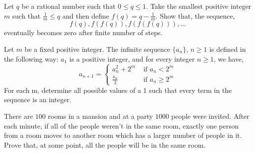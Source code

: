 \begin{problem}
Let $q$ be a rational number such that $0 \le q \le 1.$ Take the smallest positive integer 
$m$ such that $\frac{1}{m} \le q$ and then define $f (q) = q - \frac{1}{m}$. Show that, the sequence,
\[ f (q), f (f (q)), f (f (f (q))), \ldots \]
eventually becomes zero after finite number of steps.
	\begin{hintone}
	\end{hintone}
\end{problem}

\begin{problem}[APMO 2019/2]
Let $m$ be a fixed positive integer. The infinite sequence $\{a_n\}$,  $n\ge 1$
is defined in the following way: $a_1$ is a positive integer, and for every integer $n \ge 1$,
we have,
\[ a_{n+1} = \begin{cases}
			a_n ^2 + 2^m & \text{ if } a_n < 2^m \\
			\frac{a_n}{2} & \text{ if } a_n \ge 2^m
		\end{cases} 
		\]
For each m, determine all possible values of a 1 such that every term in the sequence
is an integer.
	\begin{hintone}
	\end{hintone}
\end{problem}

\begin{problem}
There are $100$ rooms in a mansion and at a party $1000$ people were invited. After
each minute, if all of the people weren’t in the same room, exactly one person from
a room moves to another room which has a larger number of people in it. Prove
that, at some point, all the people will be in the same room.
	\begin{hintone}
	\end{hintone}
\end{problem}



